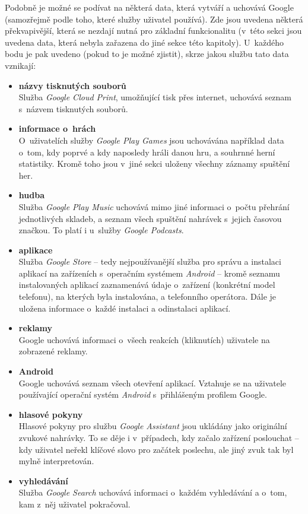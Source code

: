 Podobně je možné se podívat na některá data, která vytváří a uchovává Google (samozřejmě podle toho, které služby uživatel používá). Zde jsou uvedena některá překvapivější, která se nezdají nutná pro základní funkcionalitu (v~této sekci jsou uvedena data, která nebyla zařazena do jiné sekce této kapitoly).
U~každého bodu je pak uvedeno (pokud to je možné zjistit), skrze jakou službu tato data vznikají:

\begin{itemize}
	\item \textbf{názvy tisknutých souborů}\\
	Služba \textit{Google Cloud Print}, umožňující tisk přes internet, uchovává seznam s~názvem tisknutých souborů.

	\item \textbf{informace o~hrách}\\
	O~uživatelích služby \textit{Google Play Games} jsou uchovávána například data o~tom, kdy poprvé a kdy naposledy hráli danou hru, a souhrnné herní statistiky. Kromě toho jsou v~jiné sekci uloženy všechny záznamy spuštění her. 

	\item \textbf{hudba}\\
	Služba \textit{Google Play Music} uchovává mimo jiné informaci o~počtu přehrání jednotlivých skladeb, a seznam všech spuštění nahrávek s~jejich časovou značkou. To platí i u~služby \textit{Google Podcasts}.

	\item \textbf{aplikace}\\
	Služba \textit{Google Store} -- tedy nejpoužívanější služba pro správu a instalaci aplikací na zařízeních s~operačním systémem \textit{Android} -- kromě seznamu instalovaných aplikací zaznamenává údaje o~zařízení (konkrétní model telefonu), na kterých byla instalována, a telefonního operátora. Dále je uložena informace o~každé instalaci a odinstalaci aplikací.
	
	\item \textbf{reklamy}\\
	Google uchovává informaci o~všech reakcích (kliknutích) uživatele na zobrazené reklamy.

	\item \textbf{Android}\\
	Google uchovává seznam všech otevření aplikací. Vztahuje se na uživatele používající operační systém \textit{Android} s~přihlášeným profilem Google. 

	\item \textbf{hlasové pokyny}\\
	Hlasové pokyny pro službu \textit{Google Assistant} jsou ukládány jako originální zvukové nahrávky. To se děje i v~případech, kdy začalo zařízení poslouchat  -- kdy uživatel neřekl klíčové slovo pro začátek poslechu, ale jiný zvuk tak byl mylně interpretován. 

	\item \textbf{vyhledávání}\\
	Služba \textit{Google Search} uchovává informaci o~každém vyhledávání a o~tom, kam z~něj uživatel pokračoval.
\end{itemize}

